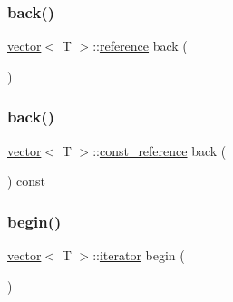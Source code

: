 \mbox{\label{classvector_aa41f79a418306ca7e1e2de5e017a369f}} 
\subsubsection{\texorpdfstring{back()}{back()}\hspace{0.1cm}{\footnotesize\ttfamily [1/2]}}
{\footnotesize\ttfamily \mbox{\hyperlink{classvector}{vector}}$<$ T $>$\+::\mbox{\hyperlink{classvector_a9b1a63f171d76a7a3995b6858e99f2ea}{reference}} back (\begin{DoxyParamCaption}{ }\end{DoxyParamCaption})}

\mbox{\label{classvector_a0325e7a80a5d2aa3978ff06218e3cb8f}} 
\subsubsection{\texorpdfstring{back()}{back()}\hspace{0.1cm}{\footnotesize\ttfamily [2/2]}}
{\footnotesize\ttfamily \mbox{\hyperlink{classvector}{vector}}$<$ T $>$\+::\mbox{\hyperlink{classvector_af9ba3e25df088c62f7d535b91672cda9}{const\+\_\+reference}} back (\begin{DoxyParamCaption}{ }\end{DoxyParamCaption}) const}

\mbox{\label{classvector_a6cd8b8b30a3890ca28321f2fbbfa85e7}} 
\subsubsection{\texorpdfstring{begin()}{begin()}}
{\footnotesize\ttfamily \mbox{\hyperlink{classvector}{vector}}$<$ T $>$\+::\mbox{\hyperlink{classvector_a35c955cacac6aacaa1e82874b1628865}{iterator}} begin (\begin{DoxyParamCaption}{ }\end{DoxyParamCaption})\hspace{0.3cm}{\ttfamily [noexcept]}}

\mbox{\label{classvector_aa29fa7b1fc0d9fe1a57aee420ea25ed7}} 
